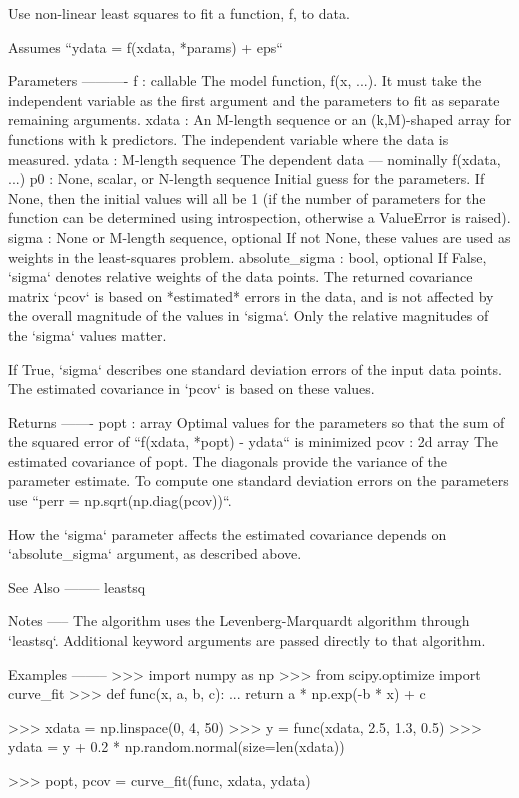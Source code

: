 \begin{DoxyVerb}Use non-linear least squares to fit a function, f, to data.

Assumes ``ydata = f(xdata, *params) + eps``

Parameters
----------
f : callable
    The model function, f(x, ...).  It must take the independent
    variable as the first argument and the parameters to fit as
    separate remaining arguments.
xdata : An M-length sequence or an (k,M)-shaped array
    for functions with k predictors.
    The independent variable where the data is measured.
ydata : M-length sequence
    The dependent data --- nominally f(xdata, ...)
p0 : None, scalar, or N-length sequence
    Initial guess for the parameters.  If None, then the initial
    values will all be 1 (if the number of parameters for the function
    can be determined using introspection, otherwise a ValueError
    is raised).
sigma : None or M-length sequence, optional
    If not None, these values are used as weights in the
    least-squares problem.
absolute_sigma : bool, optional
    If False, `sigma` denotes relative weights of the data points.
    The returned covariance matrix `pcov` is based on *estimated*
    errors in the data, and is not affected by the overall
    magnitude of the values in `sigma`. Only the relative
    magnitudes of the `sigma` values matter.

    If True, `sigma` describes one standard deviation errors of
    the input data points. The estimated covariance in `pcov` is
    based on these values.

Returns
-------
popt : array
    Optimal values for the parameters so that the sum of the squared error
    of ``f(xdata, *popt) - ydata`` is minimized
pcov : 2d array
    The estimated covariance of popt. The diagonals provide the variance
    of the parameter estimate. To compute one standard deviation errors
    on the parameters use ``perr = np.sqrt(np.diag(pcov))``.

    How the `sigma` parameter affects the estimated covariance
    depends on `absolute_sigma` argument, as described above.

See Also
--------
leastsq

Notes
-----
The algorithm uses the Levenberg-Marquardt algorithm through `leastsq`.
Additional keyword arguments are passed directly to that algorithm.

Examples
--------
>>> import numpy as np
>>> from scipy.optimize import curve_fit
>>> def func(x, a, b, c):
...     return a * np.exp(-b * x) + c

>>> xdata = np.linspace(0, 4, 50)
>>> y = func(xdata, 2.5, 1.3, 0.5)
>>> ydata = y + 0.2 * np.random.normal(size=len(xdata))

>>> popt, pcov = curve_fit(func, xdata, ydata)\end{DoxyVerb}
 \hypertarget{namespacescipy_1_1optimize_1_1minpack_adc6af5788c88efbd1c0858ba1f9ec807}{}
